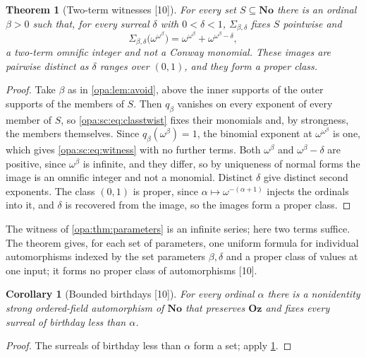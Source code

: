 \documentclass[11pt,oneside]{article}
\numberwithin{equation}{section}
\newtheorem{theorem}{Theorem}[section]
\newtheorem{corollary}[corollary]{Corollary}
\theoremstyle{definition}
\theoremstyle{remark}
\newcommand{\No}{\mathbf{No}}
\newcommand{\Oz}{\mathbf{Oz}}
\newcommand{\src}[1]{\textup{\textsf{\small[#1]}}}
\begin{document}
\begin{theorem}[Two-term witnesses \src{10}]\label{opa:sc:thm:twoterm}
For every set $S\subseteq\No$ there is an ordinal $\beta>0$ such that, for every
surreal $\delta$ with $0<\delta<1$, $\Sigma_{\beta,\delta}$ fixes $S$ pointwise and
\begin{equation}\label{opa:sc:eq:witness}
 \Sigma_{\beta,\delta}\bigl(\omega^{\omega^\beta}\bigr)=\omega^{\omega^\beta}+\omega^{\omega^\beta-\delta},
\end{equation}
a two-term omnific integer and not a Conway monomial. These images are
pairwise distinct as $\delta$ ranges over $(0,1)$, and they form a proper class.
\end{theorem}
\begin{proof}
Take $\beta$ as in \cref{opa:lem:avoid}, above the inner supports of the outer
supports of the members of $S$. Then $q_\beta$ vanishes on every exponent of every
member of $S$, so \eqref{opa:sc:eq:classtwist} fixes their monomials and, by
strongness, the members themselves. Since $q_\beta(\omega^\beta)=1$, the binomial
exponent at $\omega^{\omega^\beta}$ is one, which gives \eqref{opa:sc:eq:witness} with
no further terms. Both $\omega^\beta$ and $\omega^\beta-\delta$ are positive, since
$\omega^\beta$ is infinite, and they differ, so by uniqueness of normal forms the
image is an omnific integer and not a monomial. Distinct $\delta$ give distinct
second exponents. The class $(0,1)$ is proper, since $\alpha\mapsto\omega^{-(\alpha+1)}$
injects the ordinals into it, and $\delta$ is recovered from the image, so the
images form a proper class.
\end{proof}

The witness of \cref{opa:thm:parameters} is an infinite series; here two terms
suffice. The theorem gives, for each set of parameters, one uniform formula
for individual automorphisms indexed by the set parameters $\beta,\delta$ and a
proper class of values at one input; it forms no proper class of
automorphisms \src{10}.

\begin{corollary}[Bounded birthdays \src{10}]\label{opa:sc:cor:birthday}
For every ordinal $\alpha$ there is a nonidentity strong ordered-field automorphism
of $\No$ that preserves $\Oz$ and fixes every surreal of birthday less than
$\alpha$.
\end{corollary}
\begin{proof}
The surreals of birthday less than $\alpha$ form a set; apply
\cref{opa:sc:thm:twoterm}.
\end{proof}
\end{document}
